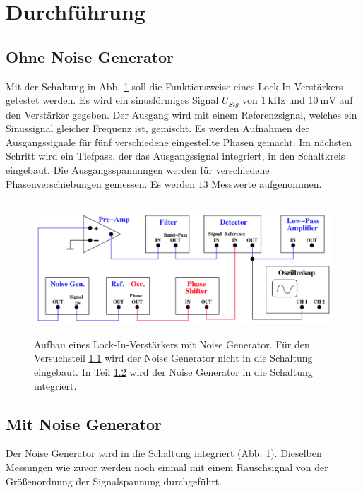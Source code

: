 \section{Durchführung}
\label{sec:Durchführung}


\subsection{Ohne Noise Generator}
\label{sec:eins}
Mit der Schaltung in Abb. \ref{lockin2} soll die Funktionsweise eines Lock-In-Verstärkers getestet werden.
Es wird ein sinusförmiges Signal $U_{Sig}$ von $\SI{1}{\kilo\hertz}$ und 
$\SI{10}{\milli\volt}$ auf den Verstärker gegeben.
Der Ausgang wird mit einem Referenzsignal, welches ein Sinussignal gleicher Frequenz ist, gemischt.
Es werden Aufnahmen der Ausgangssignale für fünf verschiedene eingestellte Phasen gemacht.
\newline
Im nächsten Schritt wird ein Tiefpass, der das Ausgangssignal integriert, 
in den Schaltkreis eingebaut. %
Die Ausgangsspannungen werden für verschiedene Phasenverschiebungen gemessen.
Es werden $\num{13}$ Messwerte aufgenommen. 
\begin{figure}
    \centering
    \includegraphics[width=12cm, height=5cm]{build/lockin2.png}
    \caption{Aufbau eines Lock-In-Verstärkers mit Noise Generator.
    Für den Versuchsteil \ref{sec:eins} wird der Noise Generator nicht in die 
    Schaltung eingebaut. In Teil \ref{sec:zwei} wird der Noise Generator in die 
    Schaltung integriert. \cite{V303}}
    \label{lockin2}
\end{figure}

\subsection{Mit Noise Generator}
\label{sec:zwei}
Der Noise Generator wird in die Schaltung integriert (Abb. \ref{lockin2}).
Dieselben Messungen wie zuvor werden noch einmal mit einem Rauschsignal von der Größenordnung der Signalspannung 
durchgeführt.

